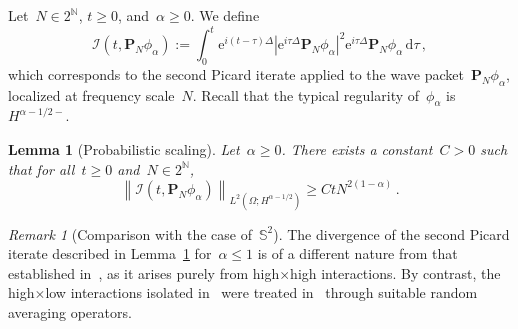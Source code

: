 \documentclass[11pt,reqno,english]{amsart}
\numberwithin{equation}{section}
\theoremstyle{plain}
\newtheorem{lemma}[theorem]{Lemma}
\theoremstyle{definition}
\theoremstyle{remark}
\newtheorem{remark}[theorem]{Remark}
\newcommand{\N}{\mathbb{N}}
\newcommand{\e}{\mathrm{e}}
\begin{document}
Let~$N\in2^{\N}$, $t\geq0$, and~$\alpha\geq0$. We define
\[
\mathcal{I}(t,\mathbf{P}_{N}\phi_{\alpha}):=\int_{0}^{t}\e^{i(t-\tau)\Delta}|\e^{i\tau\Delta}\mathbf{P}_{N}\phi_{\alpha}|^{2}\e^{i\tau\Delta}
\mathbf{P}_{N}
\phi_{\alpha}\,
\mathrm{d}\tau\,,
\]
which corresponds to the second Picard iterate applied to the wave packet~$\mathbf{P}_{N}\phi_{\alpha}$, localized at frequency scale~$N$. Recall that the typical regularity of~$\phi_{\alpha}$ is~$H^{\alpha-1/2-}$.


\begin{lemma}[Probabilistic scaling]\label{lem:ps}
	Let~$\alpha\geq0$. There exists a constant~$C>0$ such that for all~$t\geq0$ and~$N\in2^{\N}$,
	\begin{equation}
		\label{eq:scaling}
		\left\|\mathcal{I}(t,\mathbf{P}_{N}\phi_{\alpha})\right\|_{L^{2}(\Omega;H^{\alpha-1/2})}\geq CtN^{2(1-\alpha)}\,.
	\end{equation}
\end{lemma}

\begin{remark}[Comparison with the case of~$\mathbb{S}^{2}$]
	The divergence of the second Picard iterate described in Lemma~\ref{lem:ps} for~$\alpha\leq1$ is of a different nature from that established in~\cite{BCLST25}, as it arises purely from high$\times$high interactions. By contrast, the high$\times$low interactions isolated in~\cite{BCLST25} were treated in~\cite{BCST24} through suitable random averaging operators.
\end{remark}
\end{document}
